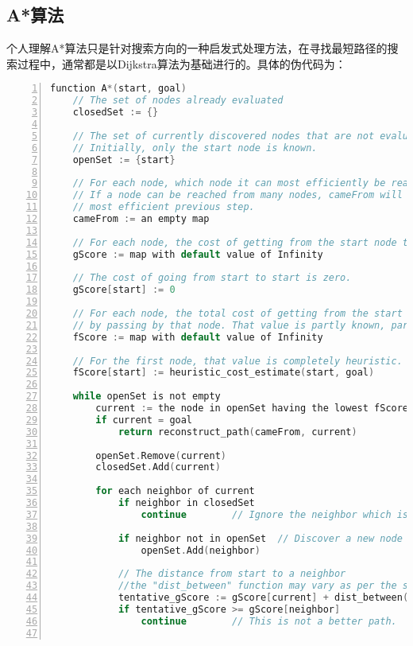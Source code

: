 \subsection{A*算法}
个人理解A*算法只是针对搜索方向的一种启发式处理方法，在寻找最短路径的搜索过程中，通常都是以Dijkstra算法为基础进行的。具体的伪代码为：
\begin{lstlisting}[language=c,numbers=left,firstnumber = 1,numberstyle=\tiny,breaklines = true,keywordstyle=\color{blue!70},commentstyle=\color{red!50!green!50!blue!50},frame=shadowbox, rulesepcolor=\color{red!20!green!20!blue!20}]
function A*(start, goal)
    // The set of nodes already evaluated
    closedSet := {}

    // The set of currently discovered nodes that are not evaluated yet.
    // Initially, only the start node is known.
    openSet := {start}

    // For each node, which node it can most efficiently be reached from.
    // If a node can be reached from many nodes, cameFrom will eventually contain the
    // most efficient previous step.
    cameFrom := an empty map

    // For each node, the cost of getting from the start node to that node.
    gScore := map with default value of Infinity

    // The cost of going from start to start is zero.
    gScore[start] := 0

    // For each node, the total cost of getting from the start node to the goal
    // by passing by that node. That value is partly known, partly heuristic.
    fScore := map with default value of Infinity

    // For the first node, that value is completely heuristic.
    fScore[start] := heuristic_cost_estimate(start, goal)

    while openSet is not empty
        current := the node in openSet having the lowest fScore[] value
        if current = goal
            return reconstruct_path(cameFrom, current)

        openSet.Remove(current)
        closedSet.Add(current)

        for each neighbor of current
            if neighbor in closedSet
                continue		// Ignore the neighbor which is already evaluated.

            if neighbor not in openSet	// Discover a new node
                openSet.Add(neighbor)
            
            // The distance from start to a neighbor
            //the "dist_between" function may vary as per the solution requirements.
            tentative_gScore := gScore[current] + dist_between(current, neighbor)
            if tentative_gScore >= gScore[neighbor]
                continue		// This is not a better path.


\end{lstlisting}
